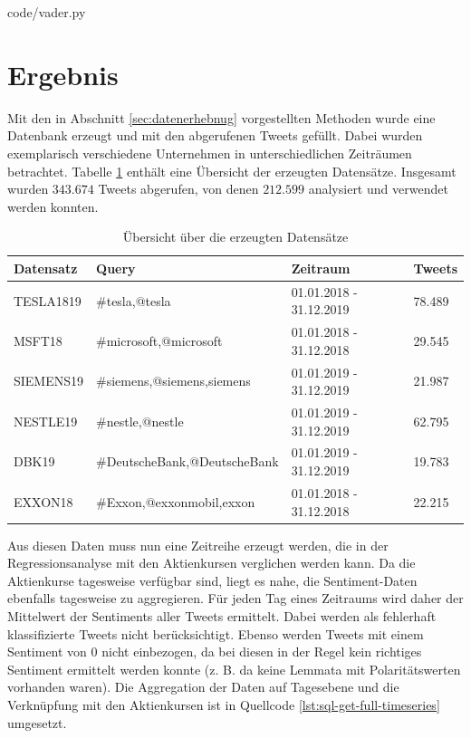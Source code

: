 \documentclass[
	a4paper,
	12pt,
	bibliography=totocnumbered,
	twoside,
]{scrreprt}
\begin{document}

                 {code/vader.py}
                 




\section{Ergebnis}
Mit den in Abschnitt \ref{sec:datenerhebnug} vorgestellten Methoden wurde eine Datenbank erzeugt und mit den abgerufenen Tweets gefüllt. Dabei wurden exemplarisch verschiedene Unternehmen in unterschiedlichen Zeiträumen betrachtet. Tabelle \ref{tab:datasets} enthält eine Übersicht der erzeugten Datensätze. Insgesamt wurden $343.674$ Tweets abgerufen, von denen $212.599$ analysiert und verwendet werden konnten.\\


\begin{table}[hbt!]
    \centering
		\begin{tabular}{| p{2.3cm} | p{5.7cm} | p{4.5cm} | p{1.5cm} |}
				\hline
				\rowcolor{tubs_blue_light60}
				\textbf{Datensatz} & \textbf{Query} & \textbf{Zeitraum} & \textbf{Tweets} \\
				\hline
				TESLA1819 & \#tesla,@tesla & 01.01.2018 - 31.12.2019 & 78.489 \\
				MSFT18 & \#microsoft,@microsoft & 01.01.2018 - 31.12.2018 & 29.545 \\
				SIEMENS19 & \#siemens,@siemens,siemens & 01.01.2019 - 31.12.2019 & 21.987 \\
				NESTLE19 & \#nestle,@nestle & 01.01.2019 - 31.12.2019 & 62.795 \\
				DBK19 & \#DeutscheBank,@DeutscheBank & 01.01.2019 - 31.12.2019 & 19.783 \\
				EXXON18 & \#Exxon,@exxonmobil,exxon & 01.01.2018 - 31.12.2018 & 22.215 \\
				\hline
		\end{tabular}
    \caption[Übersicht über die erzeugten Datensätze]{Übersicht über die erzeugten Datensätze\footnotemark}
    \label{tab:datasets}
\end{table}

Aus diesen Daten muss nun eine Zeitreihe erzeugt werden, die in der Regressionsanalyse mit den Aktienkursen verglichen werden kann. Da die Aktienkurse tagesweise verfügbar sind, liegt es nahe, die Sentiment-Daten ebenfalls tagesweise zu aggregieren. Für jeden Tag eines Zeitraums wird daher der Mittelwert der Sentiments aller Tweets ermittelt. Dabei werden als fehlerhaft klassifizierte Tweets nicht berücksichtigt. Ebenso werden Tweets mit einem Sentiment von $0$ nicht einbezogen, da bei diesen in der Regel kein richtiges Sentiment ermittelt werden konnte (z. B. da keine Lemmata mit Polaritätswerten vorhanden waren). Die Aggregation der Daten auf Tagesebene und die Verknüpfung mit den Aktienkursen ist in Quellcode \ref{lst:sql-get-full-timeseries} umgesetzt. \\
\end{document}
